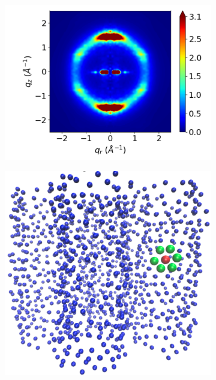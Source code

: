 \documentclass[journal=jpcbfk,manuscript=article]{achemso}
\begin{document}
\begin{figure}[!htb]
\begin{subfigure}{0.32\linewidth}
	\includegraphics[width=\textwidth]{tails_rzplot_jet.pdf}
	\caption{}\label{fig:tails_rzplot}
  \end{subfigure}
  \begin{subfigure}[t]{0.32\linewidth}
    \centering
	\includegraphics[scale=0.2]{centroids.pdf}
  \caption{}\label{fig:centroids}
  \end{subfigure}
  \begin{subfigure}[t]{0.32\linewidth}
        \centering

\end{subfigure}
\end{figure}
\end{document}
